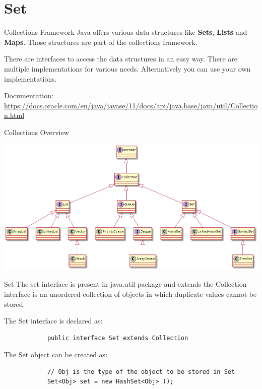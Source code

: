 	
	\section{Set}
	
	\begin{frame}{Collections Framework}
		Java offers various data structures like \textbf{Sets}, \textbf{Lists} and \textbf{Maps}.
		Those structures are part of the collections framework.
		
		There are interfaces to access the data structures in an easy way.
		There are multiple implementations for various needs.
		Alternatively you can use your own implementations.
		
		Documentation: \url{https://docs.oracle.com/en/java/javase/11/docs/api/java.base/java/util/Collection.html}
	\end{frame}
	
	\begin{frame}{Collections Overview}
		
		\includegraphics[width=\textwidth]{07_collection/collection.png}
	\end{frame}
	
	\begin{frame}[fragile]{Set}
		The set interface is present in java.util package and extends the Collection interface is an unordered collection of objects in which duplicate values cannot be stored. 
		
		The Set interface is declared as:
		\begin{lstlisting}
			public interface Set extends Collection 
		\end{lstlisting}
		
		The Set object can be created as:
		\begin{lstlisting}
			// Obj is the type of the object to be stored in Set 
			Set<Obj> set = new HashSet<Obj> (); 
		\end{lstlisting}
		
	\end{frame}
	
